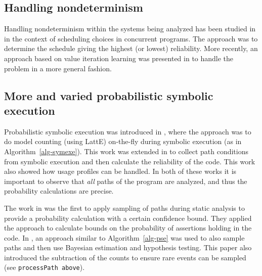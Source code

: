
\subsection{Handling nondeterminism}

Handling nondeterminism within the systems being analyzed has been studied in \cite{Filieri2013} in the context of scheduling choices in concurrent programs. The approach was to determine the schedule giving the highest (or lowest) reliability. More recently, an approach based on value iteration learning was presented in \cite{luckow2014exact} to handle the problem in a more general fashion.

\subsection{More and varied probabilistic symbolic execution}

Probabilistic symbolic execution was introduced in \cite{Geldenhuys2012}, where the approach was to do model counting (using LattE) on-the-fly during symbolic execution (as in Algorithm~\ref{alg-symexe}). This work was extended in \cite{Filieri2013} to collect path conditions from symbolic execution and then calculate the reliability of the code. This work also showed how usage profiles can be handled. In both of these works it is important to observe that {\it all} paths of the program are analyzed, and thus the probability calculations are precise. 

The work in \cite{Sankaranarayanan2013} was the first to apply sampling of paths during static analysis to provide a probability calculation with a certain confidence bound. They applied the approach to calculate bounds on the probability of assertions holding in the code. In \cite{Filieri2014}, an approach similar to Algorithm~\ref{alg-pse} was used to also sample paths and then use Bayesian estimation and hypothesis testing. This paper also introduced the subtraction of the counts to ensure rare events can be sampled (see {\tt processPath above}). 


